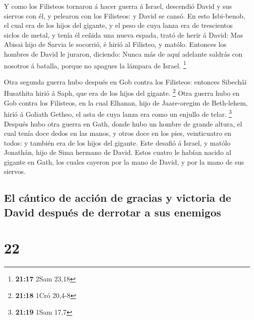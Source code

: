  Y como los Filisteos tornaron á hacer guerra á Israel,
descendió David y sus siervos con él, y pelearon con los Filisteos: y
David se cansó.  En esto Isbi-benob, el cual era de los
hijos del gigante, y el peso de cuya lanza era de trescientos siclos de
metal, y tenía él ceñida una nueva espada, trató de herir á David:
 Mas Abisai hijo de Sarvia le socorrió, é hirió al
Filisteo, y matólo. Entonces los hombres de David le juraron, diciendo:
Nunca más de aquí adelante saldrás con nosotros á batalla, porque no
apagues la lámpara de Israel. \footnote{\textbf{21:17} 2Sam 23,18}

 Otra segunda guerra hubo después en Gob contra los
Filisteos: entonces Sibechâi Husathita hirió á Saph, que era de los
hijos del gigante. \footnote{\textbf{21:18} 1Cró 20,4-8} 
Otra guerra hubo en Gob contra los Filisteos, en la cual Elhanan, hijo
de Jaare-oregim de Beth-lehem, hirió á Goliath Getheo, el asta de cuya
lanza era como un enjullo de telar. \footnote{\textbf{21:19} 1Sam 17,7}
 Después hubo otra guerra en Gath, donde hubo un hombre de
grande altura, el cual tenía doce dedos en las manos, y otros doce en
los pies, veinticuatro en todos: y también era de los hijos del gigante.
 Este desafió á Israel, y matólo Jonathán, hijo de Sima
hermano de David.  Estos cuatro le habían nacido al gigante
en Gath, los cuales cayeron por la mano de David, y por la mano de sus
siervos.

\hypertarget{el-cuxe1ntico-de-acciuxf3n-de-gracias-y-victoria-de-david-despuuxe9s-de-derrotar-a-sus-enemigos}{%
\subsection{El cántico de acción de gracias y victoria de David después
de derrotar a sus
enemigos}\label{el-cuxe1ntico-de-acciuxf3n-de-gracias-y-victoria-de-david-despuuxe9s-de-derrotar-a-sus-enemigos}}

\hypertarget{section-21}{%
\section{22}\label{section-21}}

